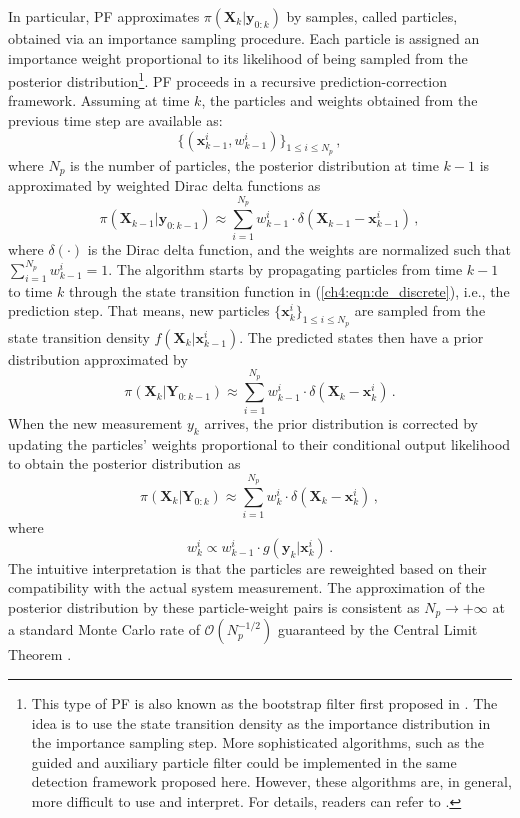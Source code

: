 In particular, PF approximates $\pi(\boldsymbol{X}_k | \boldsymbol{y}_{0:k})$ by samples, called particles, obtained via an importance sampling procedure. Each particle is assigned an importance weight proportional to its likelihood of being sampled from the posterior distribution\footnote{This type of PF is also known as the bootstrap filter first proposed in \cite{Gordon1993}. The idea is to use the state transition density as the importance distribution in the importance sampling step. More sophisticated algorithms, such as the guided and auxiliary particle filter could be implemented in the same detection framework proposed here. However, these algorithms are, in general, more difficult to use and interpret. For details, readers can refer to \cite{doucet2009tutorial}.}. PF proceeds in a recursive prediction-correction framework. Assuming at time $k$, the particles and weights obtained from the previous time step are available as:
$$
\{(\boldsymbol{x}_{k-1}^{i}, w_{k-1}^{i})\}_{1\leq i \leq N_p} \,,
$$ where $N_p$ is the number of particles, the posterior distribution at time $k-1$ is approximated by weighted Dirac delta functions as
\begin{equation}
\pi(\boldsymbol{X}_{k-1} | \boldsymbol{y}_{0:k-1}) \approx \sum_{i=1}^{N_{p}} w_{k-1}^{i} \cdot \delta(\boldsymbol{X}_{k-1}-\boldsymbol{x}_{k-1}^{i}) \,,
\end{equation} where $\delta (\cdot)$ is the Dirac delta function, and the weights are normalized such that $\sum_{i=1}^{N_{p}} w_{k-1}^{i} = 1$. The algorithm starts by propagating particles from time $k-1$ to time $k$ through the state transition function in (\ref{ch4:eqn:de_discrete}), i.e., the prediction step. That means, new particles $\{\boldsymbol{x}_k^{i}\}_{1\leq i \leq N_p}$ are sampled from the state transition density $f(\boldsymbol{X}_k|\boldsymbol{x}_{k-1}^{i})$. The predicted states then have a prior distribution approximated by 
\begin{equation}
\label{ch4:eqn:prediction}
\pi(\boldsymbol{X}_k | \boldsymbol{Y}_{0: k-1}) \approx \sum_{i=1}^{N_{p}} w_{k-1}^{i} \cdot \delta(\boldsymbol{X}_k-\boldsymbol{x}_k^{i}) \,.
\end{equation}
When the new measurement $y_k$ arrives, the prior distribution is corrected by updating the particles' weights proportional to their conditional output likelihood to obtain the posterior distribution as 
\begin{equation}
\label{ch4:eqn:particle_approx}
\pi(\boldsymbol{X}_k | \boldsymbol{Y}_{0: k}) \approx \sum_{i=1}^{N_{p}} w_k^{i} \cdot \delta(\boldsymbol{X}_k-\boldsymbol{x}_k^{i}) \,,
\end{equation} where 
$$
w_k^{i} \propto  w_{k-1}^{i} \cdot g(\boldsymbol{y}_k | \boldsymbol{x}_k^{i}) \,.
$$
The intuitive interpretation is that the particles are reweighted based on their compatibility with the actual system measurement. The approximation of the posterior distribution by these particle-weight pairs is consistent as $N_p \rightarrow +\infty$ at a standard Monte Carlo rate of $\mathcal{O}(N_{p}^{-1/2})$ guaranteed by the Central Limit Theorem \cite{doucet2009tutorial}. 

